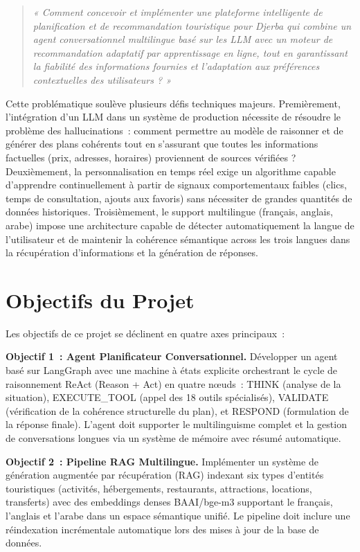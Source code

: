 \begin{quote}
\textit{« Comment concevoir et implémenter une plateforme intelligente de planification et de 
recommandation touristique pour Djerba qui combine un agent conversationnel multilingue basé sur 
les LLM avec un moteur de recommandation adaptatif par apprentissage en ligne, tout en garantissant 
la fiabilité des informations fournies et l'adaptation aux préférences contextuelles des 
utilisateurs ? »}
\end{quote}

Cette problématique soulève plusieurs défis techniques majeurs. Premièrement, l'intégration d'un 
LLM dans un système de production nécessite de résoudre le problème des hallucinations~: comment 
permettre au modèle de raisonner et de générer des plans cohérents tout en s'assurant que toutes 
les informations factuelles (prix, adresses, horaires) proviennent de sources vérifiées ? 
Deuxièmement, la personnalisation en temps réel exige un algorithme capable d'apprendre 
continuellement à partir de signaux comportementaux faibles (clics, temps de consultation, 
ajouts aux favoris) sans nécessiter de grandes quantités de données historiques. Troisièmement, 
le support multilingue (français, anglais, arabe) impose une architecture capable de détecter 
automatiquement la langue de l'utilisateur et de maintenir la cohérence sémantique across les 
trois langues dans la récupération d'informations et la génération de réponses.

\section{Objectifs du Projet}

Les objectifs de ce projet se déclinent en quatre axes principaux~:

\textbf{Objectif 1~: Agent Planificateur Conversationnel.} Développer un agent basé sur LangGraph 
avec une machine à états explicite orchestrant le cycle de raisonnement ReAct (Reason + Act) en 
quatre nœuds~: THINK (analyse de la situation), EXECUTE\_TOOL (appel des 18 outils spécialisés), 
VALIDATE (vérification de la cohérence structurelle du plan), et RESPOND (formulation de la 
réponse finale). L'agent doit supporter le multilinguisme complet et la gestion de conversations 
longues via un système de mémoire avec résumé automatique.

\textbf{Objectif 2~: Pipeline RAG Multilingue.} Implémenter un système de génération augmentée 
par récupération (RAG) indexant six types d'entités touristiques (activités, hébergements, 
restaurants, attractions, locations, transferts) avec des embeddings denses BAAI/bge-m3 
supportant le français, l'anglais et l'arabe dans un espace sémantique unifié. Le pipeline doit 
inclure une réindexation incrémentale automatique lors des mises à jour de la base de données.

